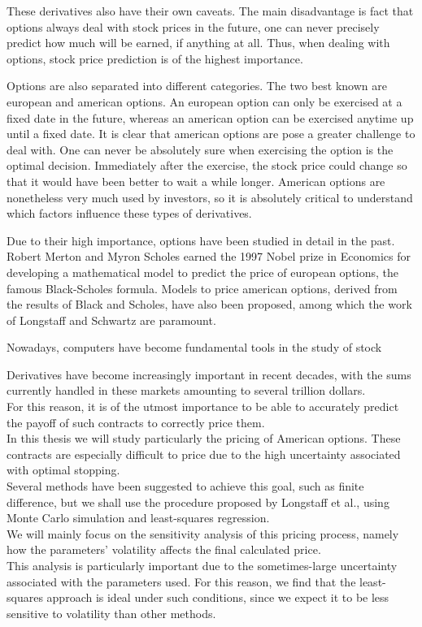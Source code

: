 \documentclass[a4paper,prd,nofootinbib,superscriptaddress,floatfix]{revtex4}
\begin{document}
These derivatives also have their own caveats. The main disadvantage is fact that options always deal with stock prices in the future, one can never precisely predict how much will be earned, if anything at all. Thus, when dealing with options, stock price prediction is of the highest importance.

Options are also separated into different categories. The two best known are european and american options. An european option can only be exercised at a fixed date in the future, whereas an american option can be exercised anytime up until a fixed date.
It is clear that american options are pose a greater challenge to deal with. One can never be absolutely sure when exercising the option is the optimal decision. Immediately after the exercise, the stock price could change so that it would have been better to wait a while longer.
American options are nonetheless very much used by investors, so it is absolutely critical to understand which factors influence these types of derivatives.

Due to their high importance, options have been studied in detail in the past.
Robert Merton and Myron Scholes earned the 1997 Nobel prize in Economics for developing a mathematical model to predict the price of european options, the famous Black-Scholes formula.
Models to price american options, derived from the results of Black and Scholes, have also been proposed, among which the work of Longstaff and Schwartz are paramount.


Nowadays, computers have become fundamental tools in the study of stock




\noindent Derivatives have become increasingly important in recent decades, with the sums currently handled in these markets amounting to several trillion dollars.\\
For this reason, it is of the utmost importance to be able to accurately predict the payoff of such contracts to correctly price them.\\
In this thesis we will study particularly the pricing of American options. These contracts are especially difficult to price due to the high uncertainty associated with optimal stopping.\\
Several methods have been suggested to achieve this goal, such as finite difference, but we shall use the procedure proposed by Longstaff et al., using Monte Carlo simulation and least-squares regression.\\
We will mainly focus on the sensitivity analysis of this pricing process, namely how the parameters’ volatility affects the final calculated price.\\
This analysis is particularly important due to the sometimes-large uncertainty associated with the parameters used. For this reason, we find that the least-squares approach is ideal under such conditions, since we expect it to be less sensitive to volatility than other methods.
\end{document}
